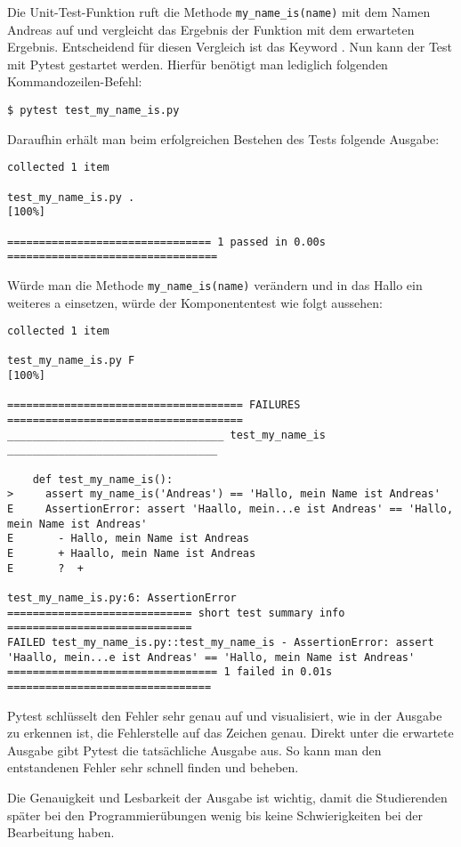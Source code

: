 Die Unit-Test-Funktion  ruft die Methode
\texttt{my\_name\_is(name)} mit dem Namen \glqq Andreas\grqq{} auf und
vergleicht das Ergebnis der Funktion mit dem erwarteten Ergebnis. Entscheidend
für diesen Vergleich ist das Keyword . Nun kann der Test mit
Pytest gestartet werden. Hierfür benötigt man lediglich folgenden
Kommandozeilen-Befehl:

\begin{lstlisting}[style=Bash]
    $ pytest test_my_name_is.py
\end{lstlisting}

Daraufhin erhält man beim erfolgreichen Bestehen des Tests folgende Ausgabe:

\begin{lstlisting}[style=Bash]
collected 1 item                                                               

test_my_name_is.py .                                                                  [100%]

================================ 1 passed in 0.00s =================================
\end{lstlisting}

Würde man die Methode \texttt{my\_name\_is(name)} verändern und in das
\glqq Hallo\grqq{} ein weiteres \glqq a\grqq{} einsetzen, würde der
Komponententest wie folgt aussehen:

\begin{lstlisting}[style=Bash]
collected 1 item                                                                                                                      

test_my_name_is.py F                                                                  [100%]

===================================== FAILURES =====================================
__________________________________ test_my_name_is _________________________________

    def test_my_name_is():
>     assert my_name_is('Andreas') == 'Hallo, mein Name ist Andreas'
E     AssertionError: assert 'Haallo, mein...e ist Andreas' == 'Hallo, mein Name ist Andreas'
E       - Hallo, mein Name ist Andreas
E       + Haallo, mein Name ist Andreas
E       ?  +

test_my_name_is.py:6: AssertionError
============================= short test summary info =============================
FAILED test_my_name_is.py::test_my_name_is - AssertionError: assert 'Haallo, mein...e ist Andreas' == 'Hallo, mein Name ist Andreas'
================================= 1 failed in 0.01s ================================
\end{lstlisting}

Pytest schlüsselt den Fehler sehr genau auf und visualisiert, wie in der Ausgabe
zu erkennen ist, die Fehlerstelle auf das Zeichen genau. Direkt unter die
erwartete Ausgabe gibt Pytest die tatsächliche Ausgabe aus. So kann man den
entstandenen Fehler sehr schnell finden und beheben.

Die Genauigkeit und Lesbarkeit der Ausgabe ist wichtig, damit die Studierenden
später bei den Programmierübungen wenig bis keine Schwierigkeiten bei der
Bearbeitung haben.